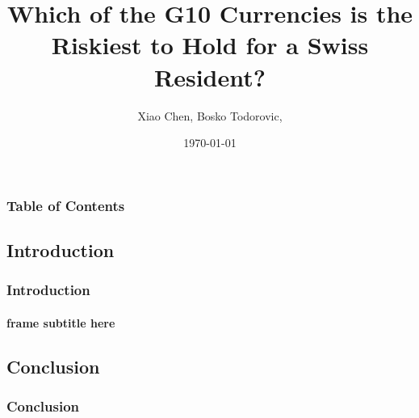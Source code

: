 \documentclass[10pt]{beamer}
\author{Xiao Chen, Bosko Todorovic,}
\title{Which of the G10 Currencies is the Riskiest to Hold for a Swiss Resident?}
\institute{University of Zurich}
\date{\today}
\begin{document}
\begin{frame}
\titlepage
\end{frame}
\begin{frame}
\frametitle{Table of Contents}
\tableofcontents
\end{frame}
\begin{frame}
\section{Introduction}
\frametitle{Introduction}
\framesubtitle{frame subtitle here}

\end{frame}
\begin{frame}
\section{Conclusion}
\frametitle{Conclusion}

\end{frame}
\end{document}
